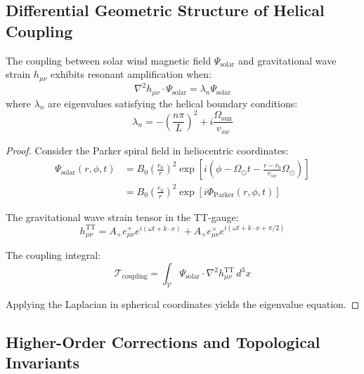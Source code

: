 \subsection{Differential Geometric Structure of Helical Coupling}


\begin{theorem}
The coupling between solar wind magnetic field $\Psi_{\text{solar}}$ and gravitational wave strain $h_{\mu\nu}$ exhibits resonant amplification when:
\begin{equation}
\nabla^2 h_{\mu\nu} \cdot \Psi_{\text{solar}} = \lambda_n \Psi_{\text{solar}}
\end{equation}
where $\lambda_n$ are eigenvalues satisfying the helical boundary conditions:
\begin{equation}
\lambda_n = -\left(\frac{n\pi}{L}\right)^2 + i\frac{\Omega_{\text{sun}}}{v_{sw}}
\end{equation}
\end{theorem}


\begin{proof}
Consider the Parker spiral field in heliocentric coordinates:
\begin{align}
\Psi_{\text{solar}}(r,\phi,t) &= B_0\left(\frac{r_0}{r}\right)^2 \exp\left[i\left(\phi - \Omega_{\odot}t - \frac{r-r_0}{v_{sw}}\Omega_{\odot}\right)\right] \\
&= B_0\left(\frac{r_0}{r}\right)^2 \exp[i\Phi_{\text{Parker}}(r,\phi,t)]
\end{align}


The gravitational wave strain tensor in the TT-gauge:
\begin{equation}
h_{\mu\nu}^{\text{TT}} = A_+ e_{\mu\nu}^+ e^{i(\omega t + k \cdot x)} + A_\times e_{\mu\nu}^\times e^{i(\omega t + k \cdot x + \pi/2)}
\end{equation}


The coupling integral:
\begin{equation}
\mathcal{T}_{\text{coupling}} = \int_{\mathcal{V}} \Psi_{\text{solar}} \cdot \nabla^2 h_{\mu\nu}^{\text{TT}} \, d^3x
\end{equation}


Applying the Laplacian in spherical coordinates yields the eigenvalue equation.
\end{proof}


\subsection{Higher-Order Corrections and Topological Invariants}


